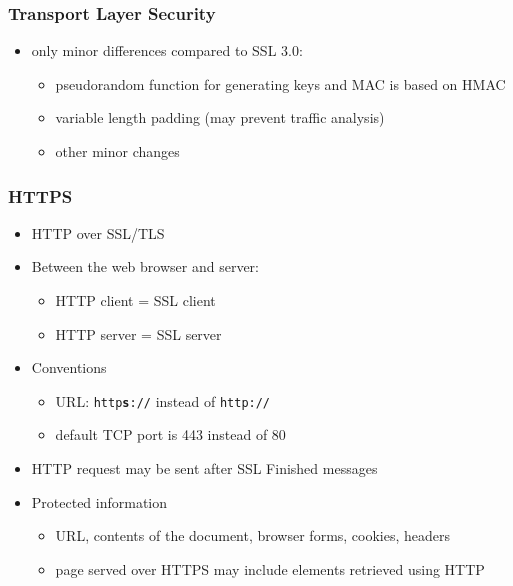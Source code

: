 \documentclass[final]{article}
\begin{document}
\subsubsection*{Transport Layer Security}
\begin{itemize}[nosep]
    \item only minor differences compared to SSL 3.0:
          \begin{itemize}[nosep]
              \item pseudorandom function for generating keys and MAC is based on HMAC
              \item variable length padding (may prevent traffic analysis)
              \item other minor changes
          \end{itemize}
\end{itemize}
\subsubsection*{HTTPS}
\begin{itemize}[nosep]
    \item HTTP over SSL/TLS
    \item Between the web browser and server:
          \begin{itemize}[nosep]
              \item HTTP client = SSL client
              \item HTTP server = SSL server
          \end{itemize}
    \item Conventions
          \begin{itemize}[nosep]
              \item URL: \texttt{http\textbf{s}://} instead of \texttt{http://}
              \item default TCP port is 443 instead of 80
          \end{itemize}
    \item HTTP request may be sent after SSL Finished messages
    \item Protected information
          \begin{itemize}[nosep]
              \item URL, contents of the document, browser forms, cookies, headers
              \item page served over HTTPS may include elements retrieved using HTTP
          \end{itemize}
\end{itemize}
\end{document}
